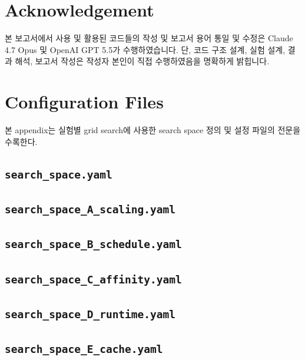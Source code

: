 \documentclass[11pt,a4paper]{article}
\begin{document}
\section*{Acknowledgement}
본 보고서에서 사용 및 활용된 코드들의 작성 및 보고서 용어 통일 및 수정은 Claude 4.7 Opus 및 OpenAI GPT 5.5가 수행하였습니다. 단, 코드 구조 설계, 실험 설계, 결과 해석, 보고서 작성은 작성자 본인이 직접 수행하였음을 명확하게 밝힙니다.

\clearpage
\appendix
\section{Configuration Files}
\label{app:configs}

본 appendix는 실험별 grid search에 사용한 search space 정의 및 설정 파일의 전문을 수록한다.

\subsection{\texttt{search\_space.yaml}}


\subsection{\texttt{search\_space\_A\_scaling.yaml}}


\subsection{\texttt{search\_space\_B\_schedule.yaml}}


\subsection{\texttt{search\_space\_C\_affinity.yaml}}


\subsection{\texttt{search\_space\_D\_runtime.yaml}}


\subsection{\texttt{search\_space\_E\_cache.yaml}}

\end{document}
